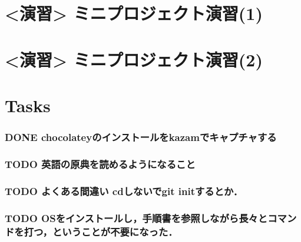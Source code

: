 \documentclass[t, aspectratio=169]{beamer}
\begin{document}
\part{<演習> ミニプロジェクト演習(1)}
\label{sec-17}
\part{<演習> ミニプロジェクト演習(2)}
\label{sec-18}
\part{Tasks}
\label{sec-19}
\section{{\bfseries\sffamily DONE} chocolateyのインストールをkazamでキャプチャする}
\label{sec-19-1}
\section{{\bfseries\sffamily TODO} 英語の原典を読めるようになること}
\label{sec-19-2}
\section{{\bfseries\sffamily TODO} よくある間違い cdしないでgit initするとか．}
\label{sec-19-3}
\section{{\bfseries\sffamily TODO} OSをインストールし，手順書を参照しながら長々とコマンドを打つ，ということが不要になった．}
\label{sec-19-4}
\end{document}

